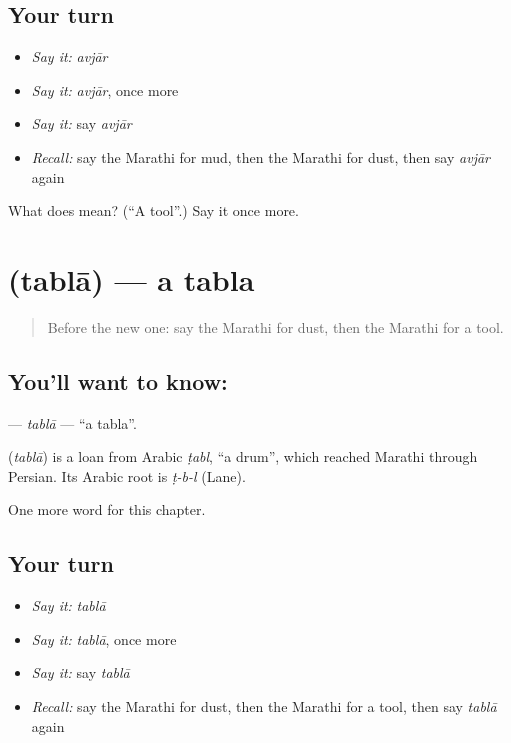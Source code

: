 \subsection*{Your turn}
\begin{itemize}
\raggedright
  \item \emph{Say it:} \emph{avjār}
  \item \emph{Say it:} \emph{avjār}, once more
  \item \emph{Say it:} say \emph{avjār}
  \item \emph{Recall:} say the Marathi for mud, then the Marathi for dust, then say \emph{avjār} again
\end{itemize}

\begin{tcolorbox}[breakable,colback=teal!4,colframe=teal!35!black,title={Before you move on}]
What does  mean? (\textquotedblleft{}A tool\textquotedblright{}.) Say it once more.
\end{tcolorbox}
\section[\texorpdfstring{\mr{तबला} (tablā)}{तबला (tablā)}]{ (tablā) — a tabla}

\label{lesson:MR-C268-tabla}



\begin{quote}
Before the new one: say the Marathi for dust, then the Marathi for a tool.
\end{quote}

\subsection*{You'll want to know: }
\textbf{} — \emph{tablā} — \textquotedblleft{}a tabla\textquotedblright{}.

\begin{cousinweb}
\textbf{} (\emph{tablā}) is a loan from Arabic \emph{ṭabl}, \textquotedblleft{}a drum\textquotedblright{}, which reached Marathi through Persian. Its Arabic root is \emph{ṭ-b-l} (Lane).
\end{cousinweb}

\begin{grammarlens}[title={What you've built}]
One more word for this chapter.
\end{grammarlens}

\subsection*{Your turn}
\begin{itemize}
\raggedright
  \item \emph{Say it:} \emph{tablā}
  \item \emph{Say it:} \emph{tablā}, once more
  \item \emph{Say it:} say \emph{tablā}
  \item \emph{Recall:} say the Marathi for dust, then the Marathi for a tool, then say \emph{tablā} again
\end{itemize}

